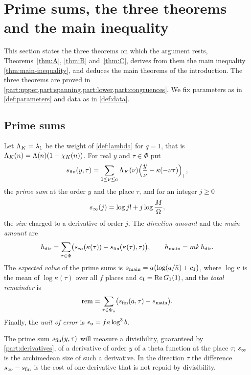 \section{Prime sums, the three theorems and the main inequality}\label{sec:main}

This section states the three theorems on which the argument rests, Theorems~\ref{thm:A},
\ref{thm:B} and~\ref{thm:C}, derives from them the main inequality \cref{thm:main-inequality}, and
deduces the main theorems of the introduction. The three theorems are proved in
\cref{part:upper,part:spanning,part:lower,part:congruences}. We fix parameters as in
\cref{def:parameters} and data as in \cref{def:data}.

\subsection{Prime sums}\label{ss:prime-sums}
Let $\Lambda_K=\lambda_1$ be the weight of \cref{def:lambda} for $q=1$, that is
$\Lambda_K(n)=\Lambda(n)(1-\chi_K(n))$. For real $y$ and $\tau\in\Phi$ put
\begin{equation}\label{eq:sfin}
  s_{\mathrm{fin}}(y,\tau)=\sum_{1\le\nu\le a}\Lambda_K(\nu)\Bigl(\frac y\nu-\kappa(-\nu\tau)\Bigr)_{\!+},
\end{equation}
the \emph{prime sum} at the order $y$ and the place $\tau$, and for an integer $j\ge0$
\begin{equation}\label{eq:sinf}
  s_\infty(j)=\log j!+j\log\frac{M}{\Omega},
\end{equation}
the \emph{size} charged to a derivative of order $j$. The \emph{direction amount} and the \emph{main
amount} are
\[
  h_{\mathrm{dir}}=\sum_{\tau\in\Phi}\bigl(s_\infty(\kappa(\tau))-s_{\mathrm{fin}}(\kappa(\tau),\tau)\bigr),
  \qquad h_{\mathrm{main}}=mk\,h_{\mathrm{dir}}.
\]
The \emph{expected value} of the prime sums is
$s_{\mathrm{main}}=a\bigl(\log(a/\bar\kappa)+c_1\bigr)$, where $\log\bar\kappa$ is the mean of $\log\kappa(\tau)$
over all $f$ places and $c_1=\operatorname{Re} G_1(1)$, and the \emph{total remainder} is
\[
  \mathrm{rem}=\sum_{\tau\in\Phi_a}\bigl(s_{\mathrm{fin}}(a,\tau)-s_{\mathrm{main}}\bigr).
\]
Finally, the \emph{unit of error} is $\epsilon_{\mathrm{u}}=fa\log^3b$.

The prime sum $s_{\mathrm{fin}}(y,\tau)$ will measure a divisibility, guaranteed by \cref{part:derivatives},
of a derivative of order $y$ of a theta function at the place $\tau$; $s_\infty$ is the archimedean
size of such a derivative. In the direction $\tau$ the difference $s_\infty-s_{\mathrm{fin}}$ is the cost of one
derivative that is not repaid by divisibility.


